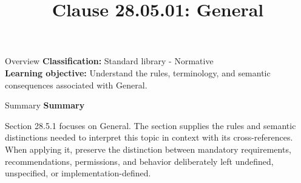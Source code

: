 \documentclass[10pt,letterpaper]{article}
\title{Clause 28.05.01: General}
\author{}
\date{}
\begin{document}
\maketitle
\begin{CornellOverviewBox}{Overview}
\textbf{Classification:} Standard library - Normative\\[2pt]
\textbf{Learning objective:} Understand the rules, terminology, and semantic consequences associated with General.
\end{CornellOverviewBox}\begin{CornellSummaryBox}{Summary}
{\sffamily\bfseries\color{Accent} Summary}\par\vspace{3pt}Section 28.5.1 focuses on General. The section supplies the rules and semantic distinctions needed to interpret this topic in context with its cross-references. When applying it, preserve the distinction between mandatory requirements, recommendations, permissions, and behavior deliberately left undefined, unspecified, or implementation-defined.
\end{CornellSummaryBox}
\end{document}
